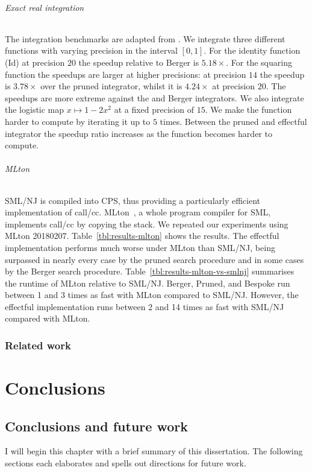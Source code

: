 \documentclass[12pt,phd,lfcs,twoside,openright,logo,leftchapter,normalheadings]{infthesis}
\theoremstyle{plain}
\theoremstyle{definition}
\begin{document}
\paragraph{Exact real integration}
The integration benchmarks are adapted from \citet{Simpson98}. We
integrate three different functions with varying precision in the
interval $[0,1]$. For the identity function (Id) at precision $20$ the
speedup relative to Berger is $5.18\times$. For the squaring function
the speedups are larger at higher precisions: at precision $14$ the
speedup is $3.78\times$ over the pruned integrator, whilst it is
$4.24\times$ at precision $20$. The speedups are more extreme against
the \naive and Berger integrators. We also integrate the logistic map
$x \mapsto 1 - 2x^2$ at a fixed precision of $15$. We make the
function harder to compute by iterating it up to $5$ times. Between
the pruned and effectful integrator the speedup ratio increases as the
function becomes harder to compute.

\paragraph{MLton}
SML/NJ is compiled into CPS, thus providing a particularly efficient
implementation of call/cc.
%
MLton~\cite{Fluet20}, a whole program compiler for SML, implements
call/cc by copying the stack.
%
We repeated our experiments using MLton 20180207.
%
Table~\ref{tbl:results-mlton} shows the results. The effectful
implementation performs much worse under MLton than SML/NJ, being
surpassed in nearly every case by the pruned search procedure and in
some cases by the Berger search procedure.
%
Table~\ref{tbl:results-mlton-vs-smlnj} summarises the runtime of MLton
relative to SML/NJ. Berger, Pruned, and Bespoke run between 1 and 3
times as fast with MLton compared to SML/NJ.
%
However, the effectful implementation runs between 2 and 14 times as
fast with SML/NJ compared with MLton.

\tablethree

\section{Related work}

\part{Conclusions}
\label{p:conclusions}

\chapter{Conclusions and future work}
\label{ch:conclusions}
%
I will begin this chapter with a brief summary of this
dissertation. The following sections each elaborates and spells out
directions for future work.
\end{document}
